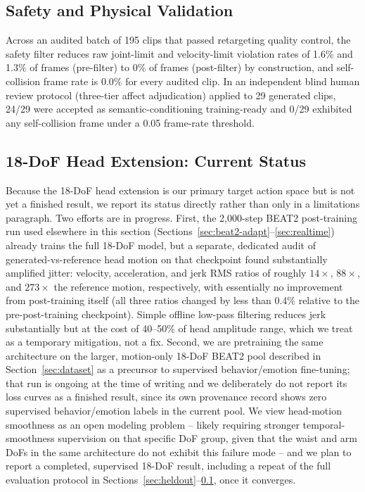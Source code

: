 \documentclass[conference]{IEEEtran}
\begin{document}
\subsection{Safety and Physical Validation}
\label{sec:safety}

Across an audited batch of 195 clips that passed retargeting quality
control, the safety filter reduces raw joint-limit and velocity-limit
violation rates of 1.6\% and 1.3\% of frames (pre-filter) to 0\% of
frames (post-filter) by construction, and self-collision frame rate is
0.0\% for every audited clip. In an independent blind human review
protocol (three-tier affect adjudication) applied to 29 generated
clips, 24/29 were accepted as semantic-conditioning training-ready and
0/29 exhibited any self-collision frame under a 0.05 frame-rate
threshold.

\subsection{18-DoF Head Extension: Current Status}
\label{sec:head-status}

Because the 18-DoF head extension is our primary target action space
but is not yet a finished result, we report its status directly rather
than only in a limitations paragraph. Two efforts are in progress.
First, the 2{,}000-step BEAT2 post-training run used elsewhere in this
section (Sections~\ref{sec:beat2-adapt}--\ref{sec:realtime}) already trains the full
18-DoF model, but a separate, dedicated audit of generated-vs-reference
head motion on that checkpoint found substantially amplified jitter:
velocity, acceleration, and jerk RMS ratios of roughly $14\times$,
$88\times$, and $273\times$ the reference motion, respectively, with
essentially no improvement from post-training itself (all three ratios
changed by less than 0.4\% relative to the pre-post-training checkpoint).
Simple offline low-pass filtering reduces jerk substantially but at the
cost of 40--50\% of head amplitude range, which we treat as a temporary
mitigation, not a fix. Second, we are pretraining the same architecture
on the larger, motion-only 18-DoF BEAT2 pool described in
Section~\ref{sec:dataset} as a precursor to supervised behavior/emotion
fine-tuning; that run is ongoing at the time of writing and we
deliberately do not report its loss curves as a finished result, since
its own provenance record shows zero supervised behavior/emotion
labels in the current pool. We view head-motion smoothness as an open
modeling problem -- likely requiring stronger temporal-smoothness
supervision on that specific DoF group, given that the waist and arm
DoFs in the same architecture do not exhibit this failure mode -- and
we plan to report a completed, supervised 18-DoF result, including a
repeat of the full evaluation protocol in
Sections~\ref{sec:heldout}--\ref{sec:safety}, once it converges.
\end{document}
